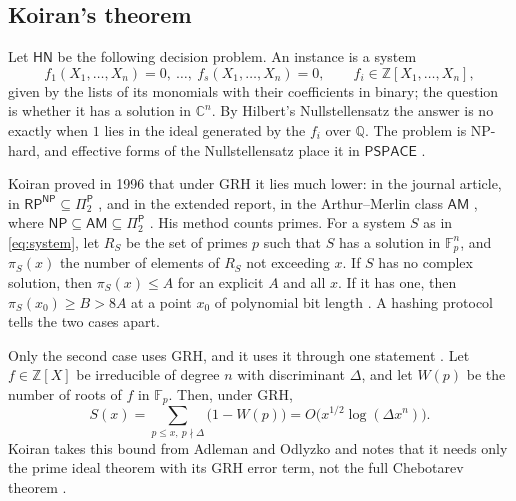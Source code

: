 \documentclass[11pt]{amsart}
\theoremstyle{definition}
\theoremstyle{remark}
\newcommand{\Z}{\mathbb Z}
\newcommand{\Q}{\mathbb Q}
\newcommand{\C}{\mathbb C}
\newcommand{\F}{\mathbb F}
\newcommand{\cl}[1]{\mathsf{#1}}
\newcommand{\HN}{\cl{HN}}
\newcommand{\AM}{\cl{AM}}
\newcommand{\Pitwo}{\Pi_2^{\cl P}}
\begin{document}
\subsection{Koiran's theorem}
Let $\HN$ be the following decision problem. An instance is a system
\begin{equation}\label{eq:system}
 f_1(X_1,\dots,X_n)=0,\ \dots,\ f_s(X_1,\dots,X_n)=0,\qquad f_i\in\Z[X_1,\dots,X_n],
\end{equation}
given by the lists of its monomials with their coefficients in binary; the question is whether it has a solution in $\C^n$. By Hilbert's Nullstellensatz the answer is no exactly when $1$ lies in the ideal generated by the $f_i$ over $\Q$. The problem is NP-hard, and effective forms of the Nullstellensatz place it in $\cl{PSPACE}$ \cite[\S1]{K96}.

Koiran proved in 1996 that under GRH it lies much lower: in the journal article, in $\cl{RP}^{\cl{NP}}\subseteq\Pitwo$ \cite[Theorem~2, p.~276]{K96}, and in the extended report, in the Arthur--Merlin class $\AM$ \cite[Theorem~2, p.~5]{K96b}, where $\cl{NP}\subseteq\AM\subseteq\Pitwo$ \cite[abstract]{K96b}. His method counts primes. For a system $S$ as in \eqref{eq:system}, let $R_S$ be the set of primes $p$ such that $S$ has a solution in $\F_p^n$, and $\pi_S(x)$ the number of elements of $R_S$ not exceeding $x$. If $S$ has no complex solution, then $\pi_S(x)\le A$ for an explicit $A$ and all $x$. If it has one, then $\pi_S(x_0)\ge B>8A$ at a point $x_0$ of polynomial bit length \cite[Theorem~1, p.~275]{K96}. A hashing protocol tells the two cases apart.

Only the second case uses GRH, and it uses it through one statement \cite[Theorem~9, p.~282]{K96}. Let $f\in\Z[X]$ be irreducible of degree $n$ with discriminant $\Delta$, and let $W(p)$ be the number of roots of $f$ in $\F_p$. Then, under GRH,
\begin{equation}\label{eq:K9}
 S(x)=\sum_{p\le x,\ p\nmid\Delta}\bigl(1-W(p)\bigr)=O\bigl(x^{1/2}\log(\Delta x^n)\bigr).
\end{equation}
Koiran takes this bound from Adleman and Odlyzko and notes that it needs only the prime ideal theorem with its GRH error term, not the full Chebotarev theorem \cite[p.~282]{K96}.
\end{document}
